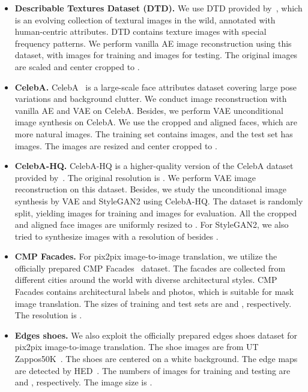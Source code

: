 \documentclass[10pt,twocolumn,letterpaper]{article}
\begin{document}
\begin{itemize}
\item \textbf{Describable Textures Dataset (DTD).} We use DTD provided by~\cite{DTD}, which is an evolving collection of textural images in the wild, annotated with human-centric attributes. DTD contains texture images with special frequency patterns. We perform vanilla AE image reconstruction using this dataset, with  images for training and  images for testing. The original images are scaled and center cropped to .

	\item \textbf{CelebA.} CelebA~\cite{celeba} is a large-scale face attributes dataset covering large pose variations and background clutter. We conduct image reconstruction with vanilla AE and VAE on CelebA. Besides, we perform VAE unconditional image synthesis on CelebA. We use the cropped and aligned faces, which are more natural images. The training set contains  images, and the test set has  images. The images are resized and center cropped to .

	\item \textbf{CelebA-HQ.} CelebA-HQ is a higher-quality version of the CelebA dataset provided by~\cite{pggan}. The original resolution is . We perform VAE image reconstruction on this dataset. Besides, we study the unconditional image synthesis by VAE and StyleGAN2 using CelebA-HQ. The dataset is randomly split, yielding  images for training and  images for evaluation. All the cropped and aligned face images are uniformly resized to . For StyleGAN2, we also tried to synthesize images with a resolution of  besides .

	\item \textbf{CMP Facades.} For pix2pix image-to-image translation, we utilize the officially prepared CMP Facades~\cite{cmpfacades} dataset. The facades are collected from different cities around the world with diverse architectural styles. CMP Facades contains architectural labels and photos, which is suitable for mask  image translation. The sizes of training and test sets are  and , respectively. The resolution is .
	
	\item \textbf{Edges  shoes.} We also exploit the officially prepared edges  shoes dataset for pix2pix image-to-image translation. The shoe images are from UT Zappos50K~\cite{shoesutzappos50K}. The shoes are centered on a white background. The edge maps are detected by HED~\cite{hededgedet}. The numbers of images for training and testing are  and , respectively. The image size is .
	

\end{itemize}
\end{document}
